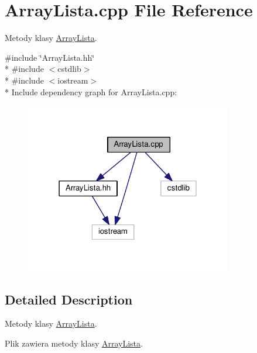 \hypertarget{a00006}{}\section{Array\+Lista.\+cpp File Reference}
\label{a00006}


Metody klasy \hyperlink{a00001}{Array\+Lista}.  


{\ttfamily \#include \char`\"{}Array\+Lista.\+hh\char`\"{}}\\*
{\ttfamily \#include $<$cstdlib$>$}\\*
{\ttfamily \#include $<$iostream$>$}\\*
Include dependency graph for Array\+Lista.\+cpp\+:\nopagebreak
\begin{figure}[H]
\begin{center}
\leavevmode
\includegraphics[width=255pt]{a00019}
\end{center}
\end{figure}


\subsection{Detailed Description}
Metody klasy \hyperlink{a00001}{Array\+Lista}. 

Plik zawiera metody klasy \hyperlink{a00001}{Array\+Lista}. 